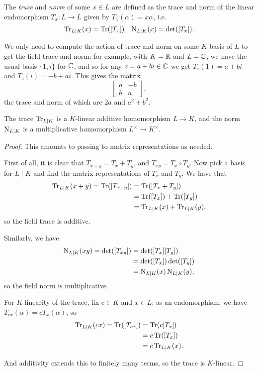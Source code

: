 \begin{defn}
	The \emph{trace} and \emph{norm} of some $x\in L$ are defined as the trace and norm of the linear endomorphism $T_x:L\to L$ given by $T_x(\alpha)=x\alpha$, i.e.
	\begin{align*}
		\operatorname{Tr}_{L\mid K}(x) = \operatorname{Tr}([T_x]) & & \operatorname{N}_{L\mid K}(x) = \det([T_x]).
	\end{align*}
\end{defn}

We only need to compute the action of trace and norm on some $K$-basis of $L$ to get the field trace and norm: for example, with $K=\mathbb{R}$ and $L=\mathbb{C}$, we have the usual basis $\{1,i\}$ for $\mathbb{C}$, and so for any $z=a+bi\in\mathbb{C}$ we get $T_z(1)=a+bi$ and $T_z(i)=-b+ai$. This gives the matrix
\[
	\begin{bmatrix}
		a & -b\\
		b & a
	\end{bmatrix},
\]
the trace and norm of which are $2a$ and $a^2+b^2$.

\begin{prop}
	The trace $\operatorname{Tr}_{L\mid K}$ is a $K$-linear additive homomorphism $L\to K$, and the norm $\operatorname{N}_{L\mid K}$ is a multiplicative homomorphism $L^\times\to K^\times$.
\end{prop}
\begin{proof}
	This amounts to passing to matrix representations as needed.

	First of all, it is clear that $T_{x+y}=T_x+T_y$, and $T_{xy}=T_x\circ T_y$. Now pick a basis for $L\mid K$ and find the matrix representations of $T_x$ and $T_y$. We have that
	\begin{align*}
		\operatorname{Tr}_{L\mid K}(x+y)=\operatorname{Tr}([T_{x+y}])&=\operatorname{Tr}([T_x+T_y])\\
			&=\operatorname{Tr}([T_x])+\operatorname{Tr}([T_y])\\
			&= \operatorname{Tr}_{L\mid K}(x)+\operatorname{Tr}_{L\mid K}(y),
	\end{align*}
	so the field trace is additive.

	Similarly, we have
	\begin{align*}
		\operatorname{N}_{L\mid K}(xy) = \det([T_{xy}]) &= \det([T_x][T_y])\\
			&= \det([T_x])\det([T_y])\\
			&= \operatorname{N}_{L\mid K}(x)\operatorname{N}_{L\mid K}(y),
	\end{align*}
	so the field norm is multiplicative.

	For $K$-linearity of the trace, fix $c\in K$ and $x\in L$: as an endomorphism, we have $T_{cx}(\alpha)=c T_x(\alpha)$, so
	\begin{align*}
		\operatorname{Tr}_{L\mid K}(cx) = \operatorname{Tr}([T_{cx}]) &= \operatorname{Tr}(c[T_x])\\
			&= c\operatorname{Tr}([T_x])\\
			&= c \operatorname{Tr}_{L\mid K}(x).
	\end{align*}

	And additivity extends this to finitely many terms, so the trace is $K$-linear.
\end{proof}




